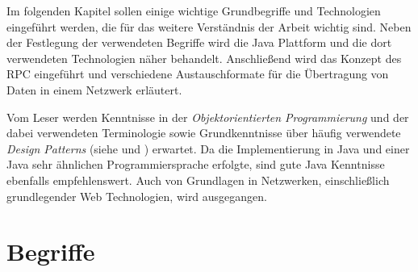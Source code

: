 \label{chap:basics}
Im folgenden Kapitel sollen einige wichtige Grundbegriffe und Technologien
eingeführt werden, die für das weitere Verständnis der Arbeit wichtig sind. Neben
der Festlegung der verwendeten Begriffe wird die Java Plattform und die dort
verwendeten Technologien näher behandelt. Anschließend wird das Konzept des
\ac{RPC} eingeführt und verschiedene Austauschformate für die Übertragung von
Daten in einem Netzwerk erläutert.

Vom Leser werden Kenntnisse in der \emph{Objektorientierten Programmierung} und
der dabei verwendeten Terminologie sowie Grundkenntnisse über häufig verwendete
\emph{Design Patterns} (siehe \cite{gof} und \cite{fowler:2002}) erwartet. Da die
Implementierung in Java und einer Java sehr ähnlichen Programmiersprache
erfolgte, sind gute Java Kenntnisse ebenfalls empfehlenswert. Auch von Grundlagen in
Netzwerken, einschließlich grundlegender Web Technologien, wird ausgegangen.

\section{Begriffe}

